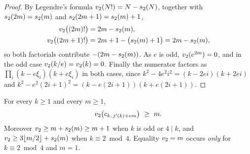 \begin{proof}
By Legendre's formula $v_2(N!) = N - s_2(N)$, together with
$s_2(2m) = s_2(m)$ and $s_2(2m+1) = s_2(m)+1$,
\begin{align*}
  v_2\bigl((2m)!\bigr) &= 2m - s_2(m), \\
  v_2\bigl((2m+1)!\bigr) &= 2m+1 - \bigl(s_2(m)+1\bigr)
    = 2m - s_2(m),
\end{align*}
so both factorials contribute $-(2m - s_2(m))$. As $e$ is odd,
$v_2(e^{2m}) = 0$, and in the odd case $v_2(k/e) = v_2(k) = 0$.
Finally the numerator factors as $\prod_i (k - e\xi_i)(k + e\xi_i)$ in both
cases, since $k^2 - 4e^2i^2 = (k-2ei)(k+2ei)$ and $k^2 - e^2(2i+1)^2 =
(k - e(2i+1))(k + e(2i+1))$.
\end{proof}

\begin{lemma}
\label{lem:tail}
For every $k \ge 1$ and every $m \ge 1$,
\[
  v_2\bigl( c_{k,\,j'(k)+em} \bigr) \ \ge \ m .
\]
Moreover $v_2 \ge m + s_2(m) \ge m+1$ when $k$ is odd or $4 \mid k$,
and $v_2 \ge 3\lfloor m/2 \rfloor + s_2(m)$ when $k \equiv 2 \bmod
4$. Equality $v_2 = m$ occurs \emph{only} for $k \equiv 2 \bmod 4$ and
$m = 1$.
\end{lemma}

